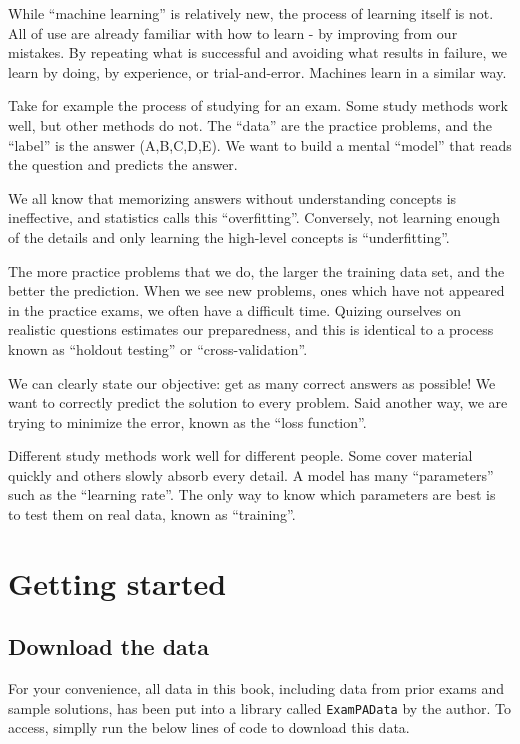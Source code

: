 \documentclass[
  openany]{book}
\begin{document}
While ``machine learning'' is relatively new, the process of learning itself is not. All of use are already familiar with how to learn - by improving from our mistakes. By repeating what is successful and avoiding what results in failure, we learn by doing, by experience, or trial-and-error. Machines learn in a similar way.

Take for example the process of studying for an exam. Some study methods work well, but other methods do not. The ``data'' are the practice problems, and the ``label'' is the answer (A,B,C,D,E). We want to build a mental ``model'' that reads the question and predicts the answer.

We all know that memorizing answers without understanding concepts is ineffective, and statistics calls this ``overfitting''. Conversely, not learning enough of the details and only learning the high-level concepts is ``underfitting''.

The more practice problems that we do, the larger the training data set, and the better the prediction. When we see new problems, ones which have not appeared in the practice exams, we often have a difficult time. Quizing ourselves on realistic questions estimates our preparedness, and this is identical to a process known as ``holdout testing'' or ``cross-validation''.

We can clearly state our objective: get as many correct answers as possible! We want to correctly predict the solution to every problem. Said another way, we are trying to minimize the error, known as the ``loss function''.

Different study methods work well for different people. Some cover material quickly and others slowly absorb every detail. A model has many ``parameters'' such as the ``learning rate''. The only way to know which parameters are best is to test them on real data, known as ``training''.

\hypertarget{getting-started}{%
\chapter{Getting started}\label{getting-started}}

\hypertarget{download-the-data}{%
\section{Download the data}\label{download-the-data}}

For your convenience, all data in this book, including data from prior exams and sample solutions, has been put into a library called \texttt{ExamPAData} by the author. To access, simplly run the below lines of code to download this data.
\end{document}
